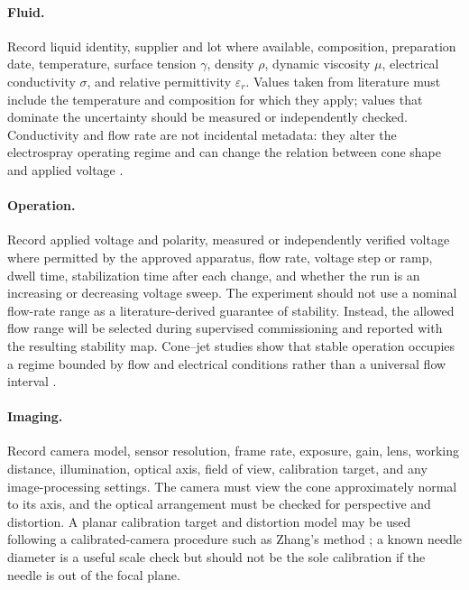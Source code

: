 \paragraph{Fluid.} Record liquid identity, supplier and lot where available, composition, preparation date, temperature, surface tension $\gamma$, density $\rho$, dynamic viscosity $\mu$, electrical conductivity $\sigma$, and relative permittivity $\varepsilon_r$. Values taken from literature must include the temperature and composition for which they apply; values that dominate the uncertainty should be measured or independently checked. Conductivity and flow rate are not incidental metadata: they alter the electrospray operating regime and can change the relation between cone shape and applied voltage \cite{hartman1999electrohydrodynamic,fernandez1994current}.

\paragraph{Operation.} Record applied voltage and polarity, measured or independently verified voltage where permitted by the approved apparatus, flow rate, voltage step or ramp, dwell time, stabilization time after each change, and whether the run is an increasing or decreasing voltage sweep. The experiment should not use a nominal flow-rate range as a literature-derived guarantee of stability. Instead, the allowed flow range will be selected during supervised commissioning and reported with the resulting stability map. Cone--jet studies show that stable operation occupies a regime bounded by flow and electrical conditions rather than a universal flow interval \cite{cloupeau1989conejet,cloupeau1994modes,hartman1999electrohydrodynamic}.

\paragraph{Imaging.} Record camera model, sensor resolution, frame rate, exposure, gain, lens, working distance, illumination, optical axis, field of view, calibration target, and any image-processing settings. The camera must view the cone approximately normal to its axis, and the optical arrangement must be checked for perspective and distortion. A planar calibration target and distortion model may be used following a calibrated-camera procedure such as Zhang's method \cite{zhang2000calibration}; a known needle diameter is a useful scale check but should not be the sole calibration if the needle is out of the focal plane.

